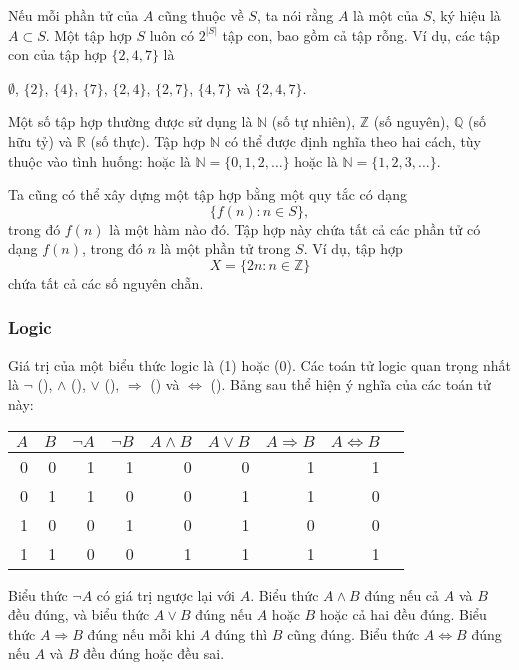 Nếu mỗi phần tử của $A$ cũng thuộc về $S$,
ta nói rằng $A$ là một  của $S$,
ký hiệu là $A \subset S$.
Một tập hợp $S$ luôn có $2^{|S|}$ tập con,
bao gồm cả tập rỗng.
Ví dụ, các tập con của tập hợp $\{2,4,7\}$ là
\begin{center}
$\emptyset$,
$\{2\}$, $\{4\}$, $\{7\}$, $\{2,4\}$, $\{2,7\}$, $\{4,7\}$ và $\{2,4,7\}$.
\end{center}

Một số tập hợp thường được sử dụng là
$\mathbb{N}$ (số tự nhiên),
$\mathbb{Z}$ (số nguyên),
$\mathbb{Q}$ (số hữu tỷ) và
$\mathbb{R}$ (số thực).
Tập hợp $\mathbb{N}$
có thể được định nghĩa theo hai cách, tùy thuộc
vào tình huống:
hoặc là $\mathbb{N}=\{0,1,2,\ldots\}$
hoặc là $\mathbb{N}=\{1,2,3,\ldots\}$.

Ta cũng có thể xây dựng một tập hợp bằng một quy tắc có dạng
\[\{f(n) : n \in S\},\]
trong đó $f(n)$ là một hàm nào đó.
Tập hợp này chứa tất cả các phần tử có dạng $f(n)$,
trong đó $n$ là một phần tử trong $S$.
Ví dụ, tập hợp
\[X=\{2n : n \in \mathbb{Z}\}\]
chứa tất cả các số nguyên chẵn.

\subsubsection{Logic}


Giá trị của một biểu thức logic là
 (1) hoặc  (0).
Các toán tử logic quan trọng nhất là
$\lnot$ (),
$\land$ (),
$\lor$ (),
$\Rightarrow$ () và
$\Leftrightarrow$ ().
Bảng sau thể hiện ý nghĩa của các toán tử này:

\begin{center}
\begin{tabular}{rr|rrrrrrr}
$A$ & $B$ & $\lnot A$ & $\lnot B$ & $A \land B$ & $A \lor B$ & $A \Rightarrow B$ & $A \Leftrightarrow B$ \\
\hline
0 & 0 & 1 & 1 & 0 & 0 & 1 & 1 \\
0 & 1 & 1 & 0 & 0 & 1 & 1 & 0 \\
1 & 0 & 0 & 1 & 0 & 1 & 0 & 0 \\
1 & 1 & 0 & 0 & 1 & 1 & 1 & 1 \\
\end{tabular}
\end{center}

Biểu thức $\lnot A$ có giá trị ngược lại với $A$.
Biểu thức $A \land B$ đúng nếu cả $A$ và $B$
đều đúng,
và biểu thức $A \lor B$ đúng nếu $A$ hoặc $B$ hoặc cả hai
đều đúng.
Biểu thức $A \Rightarrow B$ đúng
nếu mỗi khi $A$ đúng thì $B$ cũng đúng.
Biểu thức $A \Leftrightarrow B$ đúng
nếu $A$ và $B$ đều đúng hoặc đều sai.

